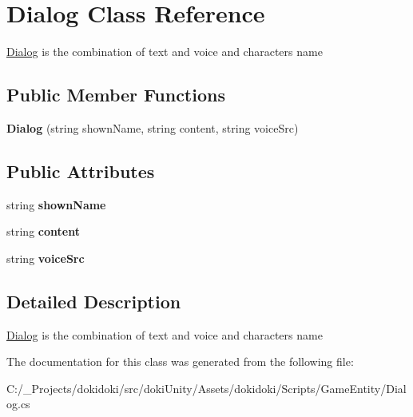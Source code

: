 \hypertarget{class_dialog}{}\section{Dialog Class Reference}
\label{class_dialog}


\hyperlink{class_dialog}{Dialog} is the combination of text and voice and character\textquotesingle{}s name  


\subsection*{Public Member Functions}
\begin{DoxyCompactItemize}
\item 
{\bfseries Dialog} (string shown\+Name, string content, string voice\+Src)\hypertarget{class_dialog_af808ebca64d85de7735909befc3ecdfb}{}\label{class_dialog_af808ebca64d85de7735909befc3ecdfb}

\end{DoxyCompactItemize}
\subsection*{Public Attributes}
\begin{DoxyCompactItemize}
\item 
string {\bfseries shown\+Name}\hypertarget{class_dialog_a91baa3b210fe2992a9aa62b09c7847fd}{}\label{class_dialog_a91baa3b210fe2992a9aa62b09c7847fd}

\item 
string {\bfseries content}\hypertarget{class_dialog_a5ffccbee8fa75b37167ad08b0fe46924}{}\label{class_dialog_a5ffccbee8fa75b37167ad08b0fe46924}

\item 
string {\bfseries voice\+Src}\hypertarget{class_dialog_a0bf56c6302f2ef63474cb9536ca3b59b}{}\label{class_dialog_a0bf56c6302f2ef63474cb9536ca3b59b}

\end{DoxyCompactItemize}


\subsection{Detailed Description}
\hyperlink{class_dialog}{Dialog} is the combination of text and voice and character\textquotesingle{}s name 



The documentation for this class was generated from the following file\+:\begin{DoxyCompactItemize}
\item 
C\+:/\+\_\+\+Projects/dokidoki/src/doki\+Unity/\+Assets/dokidoki/\+Scripts/\+Game\+Entity/Dialog.\+cs\end{DoxyCompactItemize}
